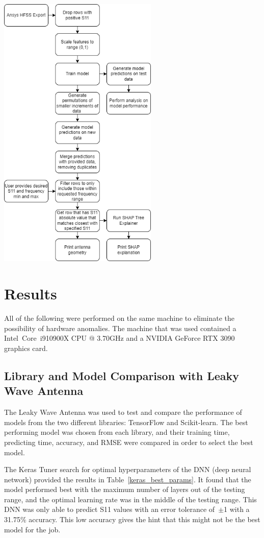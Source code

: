 \documentclass[lettersize,journal]{IEEEtran}
\newenvironment{Figure}
    {\par\medskip\noindent\minipage{\linewidth}}
    {\endminipage\par\medskip}
\begin{document}
\begin{Figure}
\centering
\includegraphics[width=3.0in]{methodology}
\label{data_flow}
\end{Figure}


\section{Results}
All of the following were performed on the same machine to eliminate the possibility of hardware anomalies. The machine that was used contained a  Intel\textregistered~Core\texttrademark~i9\-10900X CPU @ 3.70GHz and a NVIDIA GeForce RTX 3090 graphics card. 

\subsection{Library and Model Comparison with Leaky Wave Antenna}
The Leaky Wave Antenna was used to test and compare the performance of models from the two different libraries: TensorFlow and Scikit-learn. The best performing model was chosen from each library, and their training time, predicting time, accuracy, and RMSE were compared in order to select the best model.

The Keras Tuner search for optimal hyperparameters of the DNN (deep neural network) provided the results in Table~\ref{keras_best_params}. It found that the model performed best with the maximum number of layers out of the testing range, and the optimal learning rate was in the middle of the testing range. This DNN was only able to predict S11 values with an error tolerance of~$\pm$1 with a 31.75\% accuracy. This low accuracy gives the hint that this might not be the best model for the job.
\end{document}
